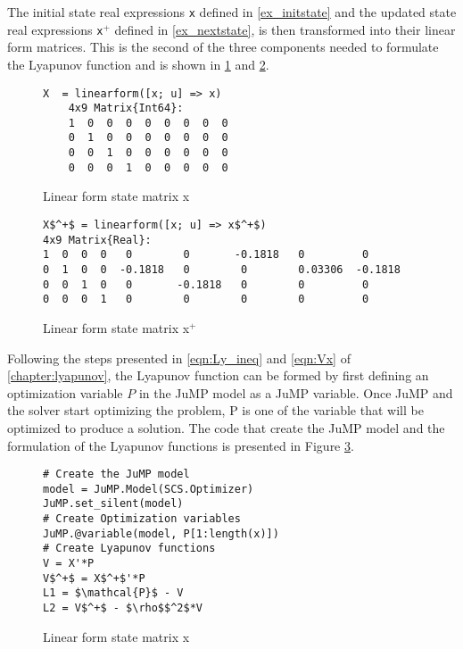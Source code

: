 The initial state real expressions \texttt{x} defined in \cref{ex_initstate} and the updated state real expressions \texttt{x$^+$} defined in \cref{ex_nextstate}, is then transformed into their linear form matrices. This is the second of the three components needed to formulate the Lyapunov function and is shown in \cref{ex_linearform_initstate} and \cref{ex_linearform_nextstate}.

\begin{figure}[h!]
    \begin{lstlisting}[mathescape]
X  = linearform([x; u] => x)
    4x9 Matrix{Int64}:
    1  0  0  0  0  0  0  0  0
    0  1  0  0  0  0  0  0  0
    0  0  1  0  0  0  0  0  0
    0  0  0  1  0  0  0  0  0    
    \end{lstlisting}
    \caption{Linear form state matrix x}
    \label{ex_linearform_initstate}
\end{figure}
\begin{figure}[h!]
    \begin{lstlisting}[mathescape]
X$^+$ = linearform([x; u] => x$^+$)
4x9 Matrix{Real}:
1  0  0  0   0        0       -0.1818   0         0
0  1  0  0  -0.1818   0        0        0.03306  -0.1818
0  0  1  0   0       -0.1818   0        0         0
0  0  0  1   0        0        0        0         0
\end{lstlisting}
\caption{Linear form state matrix x$^+$}
\label{ex_linearform_nextstate}
\end{figure}
Following the steps presented in \eqref{eqn:Ly_ineq} and \eqref{eqn:Vx} of \cref{chapter:lyapunov}, the Lyapunov function can be formed by first defining an optimization variable $P$ in the JuMP model as a JuMP variable. Once JuMP and the solver start optimizing the problem, P is one of the variable that will be optimized to produce a solution. The code that create the JuMP model and the formulation of the Lyapunov functions is presented in Figure \ref*{ex_lycode}.

\begin{figure}[h!]
    \begin{lstlisting}[mathescape]
# Create the JuMP model
model = JuMP.Model(SCS.Optimizer) 
JuMP.set_silent(model)
# Create Optimization variables
JuMP.@variable(model, P[1:length(x)]) 
# Create Lyapunov functions
V = X'*P
V$^+$ = X$^+$'*P
L1 = $\mathcal{P}$ - V
L2 = V$^+$ - $\rho$$^2$*V
\end{lstlisting}
\caption{Linear form state matrix x}
\label{ex_lycode}
\end{figure}

